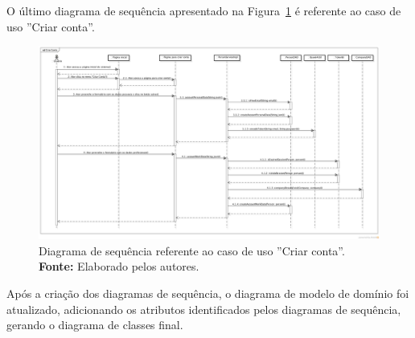 \begin{landscape}
O último diagrama de sequência apresentado na Figura~\ref{fig:ap1:diagrama_sequencia_criar_conta} é referente ao caso de uso ''Criar conta''.

\captionsetup[figure]{list=no}
\begin{figure}[h!]
	\centerline{\includegraphics[scale=0.35]{./imagens/apendices/diagrama-sequencia-criar-conta.png}}
	\caption[Diagrama de sequência referente ao caso de uso ''Criar conta''.]
	{Diagrama de sequência referente ao caso de uso ''Criar conta''. \textbf{Fonte:} Elaborado pelos autores.}
	\label{fig:ap1:diagrama_sequencia_criar_conta}
\end{figure}
\end{landscape}

Após a criação dos diagramas de sequência, o diagrama de modelo de domínio foi atualizado, adicionando os atributos identificados pelos diagramas de sequência, gerando o diagrama de classes final.
